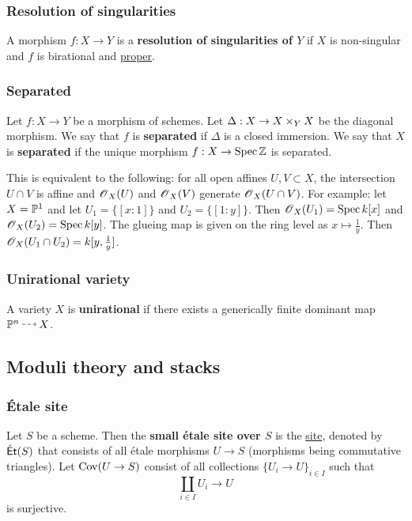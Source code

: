 \documentclass[11pt, english]{article}
\begin{document}
\subsubsection{Resolution of singularities}
\label{resolutionsing}

A morphism $f:X \to Y$ is a \textbf{resolution of singularities of $Y$} if $X$ is non-singular and $f$ is birational and \hyperref[proper]{proper}. 

\subsubsection{Separated}
\label{separated}
Let $f:X \to Y$ be a morphism of schemes. Let $\Delta:X \to X \times_Y X$ be the diagonal morphism. We say that $f$ is \textbf{separated} if $\Delta$ is a closed immersion. We say that $X$ is \textbf{separated} if the unique morphism $f:X \to \operatorname{Spec} \mathbb{Z}$ is separated.

This is equivalent to the following: for all open affines $U,V \subset X$, the intersection $U \cap V$ is affine and $\operatorname{\mathscr{O}}_X(U)$ and $\operatorname{\mathscr{O}}_X(V)$ generate $\operatorname{\mathscr{O}}_X(U \cap V)$. For example: let $X=\mathbb{P}^1$ and let $U_1=\{ [x:1] \}$ and $U_2= \{ [1:y] \}$. Then $\operatorname{\mathscr{O}}_X(U_1)=\operatorname{Spec} k[x]$ and $\operatorname{\mathscr{O}}_X(U_2)=\operatorname{Spec} k[y]$. The glueing map is given on the ring level as $x \mapsto \frac 1y$. Then $\operatorname{\mathscr{O}}_X(U_1 \cap U_2) = k[y,\frac 1y]$. 

\subsubsection{Unirational variety}
\label{unirational}

A variety $X$ is \textbf{unirational} if there exists a generically finite dominant map $\PP^n \rmap X$. 

\subsection{Moduli theory and stacks} 

\subsubsection{Étale site}
\label{etalesite}

Let $S$ be a scheme. Then the \textbf{small étale site over $S$} is the \hyperref[site]{site}, denoted by $\mathsf{\acute{E}t}(S)$ that consists of all étale morphisms $U \to S$ (morphisms being commutative triangles). Let $\operatorname{Cov}(U \to S)$ consist of all collections $\{ U_i \to U \}_{i \in I}$ such that
\[
\coprod_{i \in I} U_i \to U
\]
is surjective.
\end{document}
